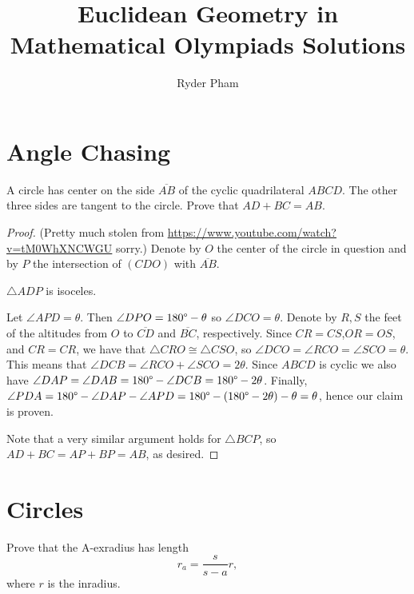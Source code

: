 \documentclass[letterpaper,oneside]{scrartcl}
\providecommand{\ol}{\overline}
\begin{document}
\title{Euclidean Geometry in Mathematical Olympiads Solutions}
\author{Ryder Pham}
\maketitle

\section{Angle Chasing}
\begin{problem*}
  [1.51, IMO 1985/1]
  A circle has center on the side $\ol{AB}$ of the cyclic quadrilateral $ABCD$. The other three sides are tangent to the circle. Prove that $AD + BC = AB$.
\end{problem*}

\begin{proof}
  (Pretty much stolen from \url{https://www.youtube.com/watch?v=tM0WhXNCWGU} sorry.)
  Denote by \(O\) the center of the circle in question and by \(P\) the intersection of \((CDO)\) with \(\ol{AB}\).
  \begin{claim*}
    \(\triangle ADP\) is isoceles.
  \end{claim*}
  \begin{subproof}
    Let \(\angle APD = \theta\). Then \(\angle DPO = 180\degree - \theta\) so \(\angle DCO = \theta\). Denote by \(R,S\) the feet of the altitudes from \(O\) to \(\ol{CD}\) and \(\ol{BC}\), respectively. Since \(CR = CS\),\(OR = OS\), and \(CR = CR\), we have that \(\triangle CRO \cong \triangle CSO\), so \(\angle DCO = \angle RCO = \angle SCO = \theta\). This means that \(\angle DCB = \angle RCO + \angle SCO = 2\theta\). Since \(ABCD\) is cyclic we also have \(\angle DAP = \angle DAB = 180\degree - \angle DCB = 180\degree - 2\theta\). Finally, \(\angle PDA = 180\degree - \angle DAP - \angle APD = 180\degree - (180\degree - 2\theta) - \theta = \theta\), hence our claim is proven.
  \end{subproof}
  Note that a very similar argument holds for \(\triangle BCP\), so \(AD+BC = AP + BP = AB\), as desired.
\end{proof}
\newpage
\section{Circles}

\begin{lemma*}
  [2.19]
  Prove that the A-exradius has length
  $$r_a = \frac{s}{s-a}r,$$
  where $r$ is the inradius.
\end{lemma*}
\end{document}

